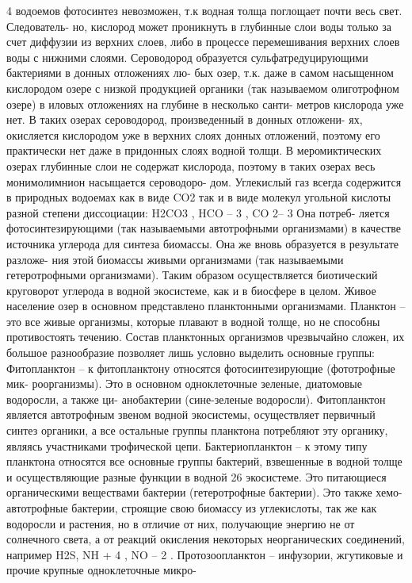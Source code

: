 4
водоемов фотосинтез невозможен, т.к водная толща поглощает почти весь свет. Следователь-
но, кислород может проникнуть в глубинные слои воды только за счет диффузии из верхних
слоев, либо в процессе перемешивания верхних слоев воды с нижними слоями.
Сероводород образуется сульфатредуцирующими бактериями в донных отложениях лю-
бых озер, т.к. даже в самом насыщенном кислородом озере с низкой продукцией органики
(так называемом олиготрофном озере) в иловых отложениях на глубине в несколько санти-
метров кислорода уже нет. В таких озерах сероводород, произведенный в донных отложени-
ях, окисляется кислородом уже в верхних слоях донных отложений, поэтому его практически
нет даже в придонных слоях водной толщи. В меромиктических озерах глубинные слои не
содержат кислорода, поэтому в таких озерах весь монимолимнион насыщается сероводоро-
дом.
Углекислый газ всегда содержится в природных водоемах как в виде CO2
так и в виде
молекул угольной кислоты разной степени диссоциации: H2CO3
, HCO –
3
, CO 2–
3 Она потреб-
ляется фотосинтезирующими (так называемыми автотрофными организмами) в качестве
источника углерода для синтеза биомассы. Она же вновь образуется в результате разложе-
ния этой биомассы живыми организмами (так называемыми гетеротрофными организмами).
Таким образом осуществляется биотический круговорот углерода в водной экосистеме, как
и в биосфере в целом.
Живое население озер в основном представлено планктонными организмами. Планктон –
это все живые организмы, которые плавают в водной толще, но не способны противостоять
течению. Состав планктонных организмов чрезвычайно сложен, их большое разнообразие
позволяет лишь условно выделить основные группы:
Фитопланктон – к фитопланктону относятся фотосинтезирующие (фототрофные мик-
роорганизмы). Это в основном одноклеточные зеленые, диатомовые водоросли, а также ци-
анобактерии (сине-зеленые водоросли). Фитопланктон является автотрофным звеном водной
экосистемы, осуществляет первичный синтез органики, а все остальные группы планктона
потребляют эту органику, являясь участниками трофической цепи.
Бактериопланктон – к этому типу планктона относятся все основные группы бактерий,
взвешенные в водной толще и осуществляющие разные функции в водной 26 экосистеме.
Это питающиеся органическими веществами бактерии (гетеротрофные бактерии). Это также
хемо-автотрофные бактерии, строящие свою биомассу из углекислоты, так же как водоросли
и растения, но в отличие от них, получающие энергию не от солнечного света, а от реакций
окисления некоторых неорганических соединений, например H2S, NH +
4
, NO –
2
.
Протозоопланктон – инфузории, жгутиковые и прочие крупные одноклеточные микро-
